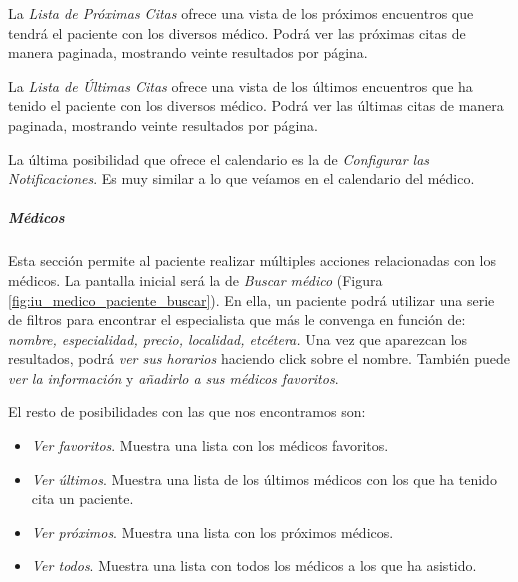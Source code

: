		La \textit{Lista de Próximas Citas} ofrece una vista de los próximos encuentros que tendrá el paciente con los diversos médico. Podrá ver las próximas citas de manera paginada, mostrando veinte resultados por página.	
		
		La \textit{Lista de Últimas Citas} ofrece una vista de los últimos encuentros que ha tenido el paciente con los diversos médico. Podrá ver las últimas citas de manera paginada, mostrando veinte resultados por página.		
		
		La última posibilidad que ofrece el calendario es la de \textit{Configurar las Notificaciones}. Es muy similar a lo que veíamos en el calendario del médico. 	
		
		
		\subparagraph{Médicos} %
		\label{par:paciente_medicos}
		
			Esta sección permite al paciente realizar múltiples acciones relacionadas con los médicos. La pantalla inicial será la de \textit{Buscar médico} (Figura \ref{fig:iu_medico_paciente_buscar}). En ella, un paciente podrá utilizar una serie de filtros para encontrar el especialista que más le convenga en función de: \textit{nombre, especialidad, precio, localidad, etcétera.} Una vez que aparezcan los resultados, podrá \textit{ver sus horarios} haciendo click sobre el nombre. También puede \textit{ver la información} y \textit{añadirlo a sus médicos favoritos}. 
			
			
			El resto de posibilidades con las que nos encontramos son:
			\begin{itemize}
				\item \textit{Ver favoritos}. Muestra una lista con los médicos favoritos.
				\item \textit{Ver últimos}. Muestra una lista de los últimos médicos con los que ha tenido cita un paciente.
				\item \textit{Ver próximos}. Muestra una lista con los próximos médicos.
				\item \textit{Ver todos}. Muestra una lista con todos los médicos a los que ha asistido.
			\end{itemize}
		
